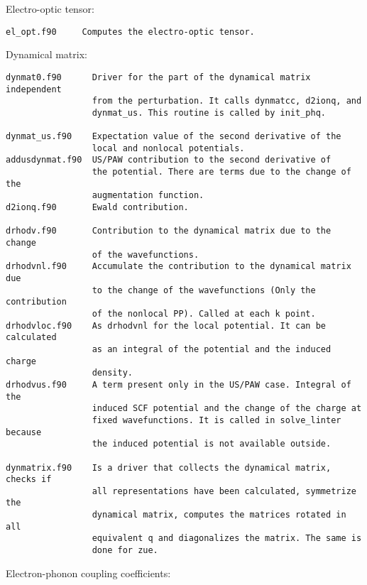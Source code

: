 \documentclass[12pt,a4paper]{article}
\begin{document}
Electro-optic tensor:

\begin{verbatim}
el_opt.f90     Computes the electro-optic tensor.
\end{verbatim}

Dynamical matrix:

\begin{verbatim}
dynmat0.f90      Driver for the part of the dynamical matrix independent
                 from the perturbation. It calls dynmatcc, d2ionq, and 
                 dynmat_us. This routine is called by init_phq. 

dynmat_us.f90    Expectation value of the second derivative of the 
                 local and nonlocal potentials.                 
addusdynmat.f90  US/PAW contribution to the second derivative of 
                 the potential. There are terms due to the change of the
                 augmentation function.               
d2ionq.f90       Ewald contribution.            

drhodv.f90       Contribution to the dynamical matrix due to the change
                 of the wavefunctions.
drhodvnl.f90     Accumulate the contribution to the dynamical matrix due 
                 to the change of the wavefunctions (Only the contribution
                 of the nonlocal PP). Called at each k point.        
drhodvloc.f90    As drhodvnl for the local potential. It can be calculated
                 as an integral of the potential and the induced charge 
                 density.
drhodvus.f90     A term present only in the US/PAW case. Integral of the
                 induced SCF potential and the change of the charge at
                 fixed wavefunctions. It is called in solve_linter because
                 the induced potential is not available outside.      

dynmatrix.f90    Is a driver that collects the dynamical matrix, checks if
                 all representations have been calculated, symmetrize the
                 dynamical matrix, computes the matrices rotated in all 
                 equivalent q and diagonalizes the matrix. The same is
                 done for zue.                 
\end{verbatim}

Electron-phonon coupling coefficients:
\end{document}
